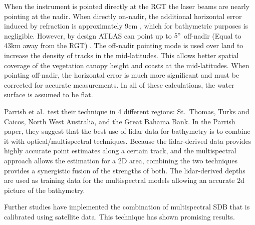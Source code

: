When the instrument is pointed directly at the RGT the laser beams are nearly pointing at the nadir. When directly on-nadir, the additional horizontal error induced by refraction is approximately 9cm \cite{Parrish2019}, which for bathymetric purposes is negligible. However, by design ATLAS can point up to $5 \degree$ off-nadir (Equal to 43km away from the RGT) \cite{Magruder2021}. The off-nadir pointing mode is used over land to increase the density of tracks in the mid-latitudes. This allows better spatial coverage of the vegetation canopy height and coasts at the mid-latitudes. When pointing off-nadir, the horizontal error is much more significant and must be corrected for accurate measurements. In all of these calculations, the water surface is assumed to be flat.

Parrish et al.~test their technique in 4 different regions: St.~Thomas, Turks and Caicos, North West Australia, and the Great Bahama Bank. In the Parrish paper, they suggest that the best use of lidar data for bathymetry is to combine it with optical/multispectral techniques. Because the lidar-derived data provides highly accurate point estimates along a certain track, and the multispectral approach allows the estimation for a 2D area, combining the two techniques provides a synergistic fusion of the strengths of both. The lidar-derived depths are used as training data for the multispectral models allowing an accurate 2d picture of the bathymetry.

Further studies have implemented the combination of multispectral SDB that is calibrated using satellite data. This technique has shown promising results.



